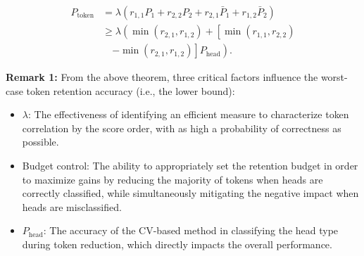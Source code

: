 \begin{align}
    P_{\text{token}} &= \lambda \left( r_{1,1} P_1 + r_{2,2} P_2 + r_{2,1} \bar{P}_1 + r_{1,2} \bar{P}_2 \right) \nonumber \\
    &\geq \lambda \left( \min(r_{2,1}, r_{1,2}) + \left[ \min(r_{1,1}, r_{2,2}) \right. \right. \nonumber \\
    &\quad \left. \left. - \min(r_{2,1}, r_{1,2}) \right] P_{\text{head}} \right).
\end{align}


\textbf{Remark 1:} From the above theorem, three critical factors influence the worst-case token retention accuracy (i.e., the lower bound):
\begin{itemize}
    \item \( \lambda \): The effectiveness of identifying an efficient measure to characterize token correlation by the score order, with as high a probability of correctness as possible.
    \item Budget control: The ability to appropriately set the retention budget in order to maximize gains by reducing the majority of tokens when heads are correctly classified, while simultaneously mitigating the negative impact when heads are misclassified.
    \item \( P_{\text{head}} \): The accuracy of the CV-based method in classifying the head type during token reduction, which directly impacts the overall performance.
\end{itemize}




